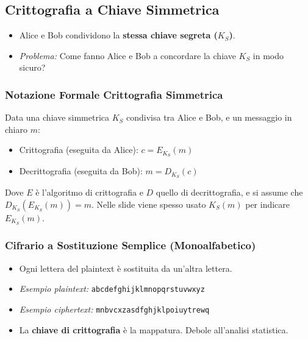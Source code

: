 \subsection{Crittografia a Chiave Simmetrica}
\begin{itemize}
    \item Alice e Bob condividono la \textbf{stessa chiave segreta ($K_S$)}.
    \item \textit{Problema:} Come fanno Alice e Bob a concordare la chiave $K_S$ in modo sicuro?
\end{itemize}

\subsubsection{Notazione Formale Crittografia Simmetrica}
\label{ssubsec:notazione_simmetrica}
Data una chiave simmetrica $K_S$ condivisa tra Alice e Bob, e un messaggio in chiaro $m$:
\begin{itemize}
    \item Crittografia (eseguita da Alice): $c = E_{K_S}(m)$
    \item Decrittografia (eseguita da Bob): $m = D_{K_S}(c)$
\end{itemize}
Dove $E$ è l'algoritmo di crittografia e $D$ quello di decrittografia, e si assume che $D_{K_S}(E_{K_S}(m)) = m$.
Nelle slide viene spesso usato $K_S(m)$ per indicare $E_{K_S}(m)$.

\subsubsection{Cifrario a Sostituzione Semplice (Monoalfabetico)}
\begin{itemize}
    \item Ogni lettera del plaintext è sostituita da un'altra lettera.
    \item \textit{Esempio plaintext:} \texttt{abcdefghijklmnopqrstuvwxyz}
    \item \textit{Esempio ciphertext:} \texttt{mnbvcxzasdfghjklpoiuytrewq}
    \item La \textbf{chiave di crittografia} è la mappatura. Debole all'analisi statistica.
\end{itemize}

